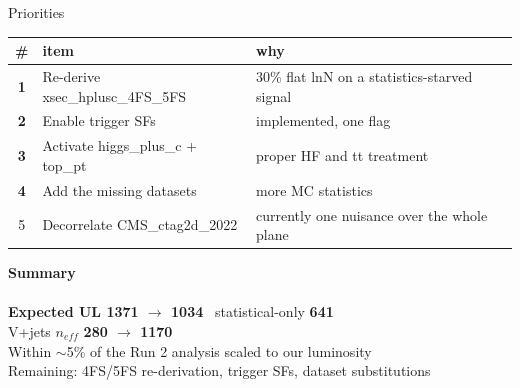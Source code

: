 \documentclass[aspectratio=169,10pt]{beamer}
\newcommand{\code}[1]{{\ttfamily\small\colorbox{codebg}{#1}}}
\begin{document}
\begin{frame}{Priorities}
\vspace{0.4em}
\begin{center}
\small
\begin{tabular}{clp{}}
\toprule
\# & item & why \\
\midrule
\textbf{1} & Re-derive \code{xsec\_hplusc\_4FS\_5FS} & 30\% flat lnN on a
statistics-starved signal \\
\textbf{2} & Enable trigger SFs & implemented, one flag \\
\textbf{3} & Activate \code{higgs\_plus\_c} + \code{top\_pt} & proper HF and tt
treatment \\
\textbf{4} & Add the missing datasets & more MC statistics \\
5 & Decorrelate \code{CMS\_ctag2d\_2022} & currently one nuisance over the whole plane \\
\bottomrule
\end{tabular}
\end{center}
\end{frame}

{
\begin{frame}[plain]
  \vfill
  \begin{center}
    {\Huge\bfseries\color{white} Summary}\\[0.6em]
    \colorbox{deckgold}{\makebox[0.3\textwidth]{\rule{0pt}{1.2pt}}}\\[1.0em]
    {\color{white} \textbf{Expected UL 1371 $\rightarrow$ 1034} \textperiodcentered\
     statistical-only \textbf{641}}\\[0.6em]
    {\color{white} V+jets $n_{eff}$ \textbf{280 $\rightarrow$ 1170}}\\[1.0em]
    {\large\color{white} Within $\sim$5\% of the Run 2 analysis scaled to our luminosity}\\[1.0em]
    {\color{white!85!deckblue}\small Remaining: 4FS/5FS re-derivation, trigger SFs,
     dataset substitutions}
  \end{center}
  \vfill
\end{frame}}
\end{document}
